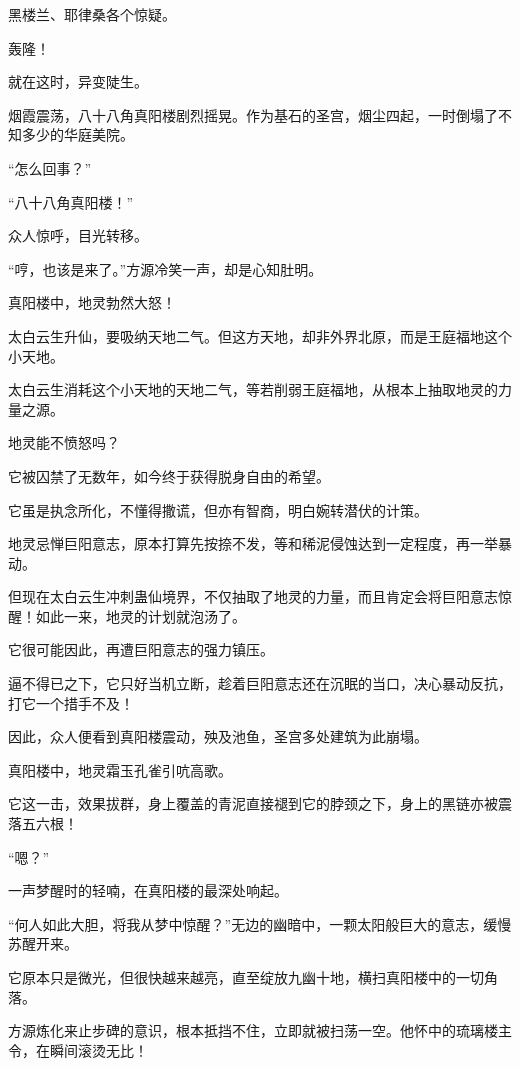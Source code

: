 \begin{this_body}
黑楼兰、耶律桑各个惊疑。

轰隆！

就在这时，异变陡生。

烟霞震荡，八十八角真阳楼剧烈摇晃。作为基石的圣宫，烟尘四起，一时倒塌了不知多少的华庭美院。

“怎么回事？”

“八十八角真阳楼！”

众人惊呼，目光转移。

“哼，也该是来了。”方源冷笑一声，却是心知肚明。

真阳楼中，地灵勃然大怒！

太白云生升仙，要吸纳天地二气。但这方天地，却非外界北原，而是王庭福地这个小天地。

太白云生消耗这个小天地的天地二气，等若削弱王庭福地，从根本上抽取地灵的力量之源。

地灵能不愤怒吗？

它被囚禁了无数年，如今终于获得脱身自由的希望。

它虽是执念所化，不懂得撒谎，但亦有智商，明白婉转潜伏的计策。

地灵忌惮巨阳意志，原本打算先按捺不发，等和稀泥侵蚀达到一定程度，再一举暴动。

但现在太白云生冲刺蛊仙境界，不仅抽取了地灵的力量，而且肯定会将巨阳意志惊醒！如此一来，地灵的计划就泡汤了。

它很可能因此，再遭巨阳意志的强力镇压。

逼不得已之下，它只好当机立断，趁着巨阳意志还在沉眠的当口，决心暴动反抗，打它一个措手不及！

因此，众人便看到真阳楼震动，殃及池鱼，圣宫多处建筑为此崩塌。

真阳楼中，地灵霜玉孔雀引吭高歌。

它这一击，效果拔群，身上覆盖的青泥直接褪到它的脖颈之下，身上的黑链亦被震落五六根！

“嗯？”

一声梦醒时的轻喃，在真阳楼的最深处响起。

“何人如此大胆，将我从梦中惊醒？”无边的幽暗中，一颗太阳般巨大的意志，缓慢苏醒开来。

它原本只是微光，但很快越来越亮，直至绽放九幽十地，横扫真阳楼中的一切角落。

方源炼化来止步碑的意识，根本抵挡不住，立即就被扫荡一空。他怀中的琉璃楼主令，在瞬间滚烫无比！

\end{this_body}

